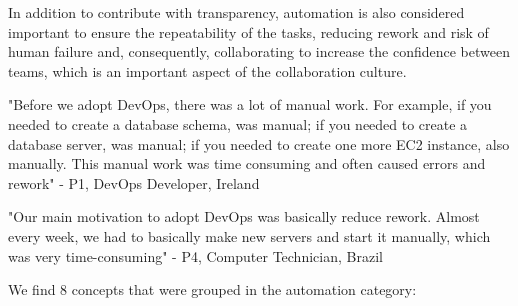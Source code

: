 In addition to contribute with transparency, automation is also considered
important to ensure the repeatability of the tasks, reducing rework and risk of
human failure and, consequently, collaborating to increase the confidence
between teams, which is an important aspect of the collaboration culture.

"Before we adopt DevOps, there was a lot of manual work. For example, if you
needed to create a database schema, was manual; if you needed to create a
database server, was manual; if you needed to create one more EC2 instance,
also manually. This manual work was time consuming and often caused errors and
rework" - P1, DevOps Developer, Ireland

"Our main motivation to adopt DevOps was basically reduce rework. Almost every
week, we had to basically make new servers and start it manually, which was
very time-consuming" - P4, Computer Technician, Brazil

We find 8 concepts that were grouped in the automation category:

